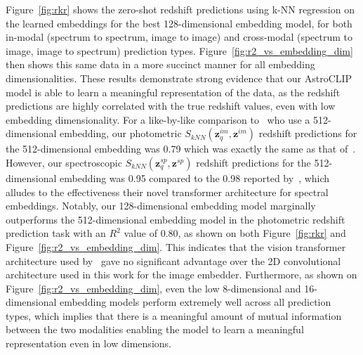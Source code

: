 Figure~\eqref{fig:rkr} shows the zero-shot redshift predictions using k-NN regression on the learned embeddings for
the best 128-dimensional embedding model, for both in-modal (spectrum to spectrum, image to image) and cross-modal (spectrum to image,
image to spectrum) prediction types.
Figure~\eqref{fig:r2_vs_embedding_dim} then shows this same data in a more succinct manner for all embedding dimensionalities.
These results demonstrate strong evidence that our AstroCLIP model is able to learn a meaningful representation of the
data, as the redshift predictions are highly correlated with the true redshift values, even with low embedding dimensionality.
For a like-by-like comparison to~\cite{astroclip} who use a 512-dimensional embedding, our photometric
$S_{kNN}(\mathbf{z}_{q}^{im}, \mathbf{z}^{im})$ redshift predictions for the 512-dimensional embedding was 0.79 which was
exactly the same as that of~\cite{astroclip}.
However, our spectroscopic $S_{kNN}(\mathbf{z}_{q}^{sp}, \mathbf{z}^{sp})$ redshift predictions for the 512-dimensional
embedding was 0.95 compared to the 0.98 reported by~\cite{astroclip}, which alludes to the effectiveness their novel
transformer architecture for spectral embeddings.
Notably, our 128-dimensional embedding model marginally outperforms the 512-dimensional embedding model in the
photometric redshift prediction task with an $R^{2}$ value of 0.80, as shown on both Figure~\eqref{fig:rkr}
and Figure~\eqref{fig:r2_vs_embedding_dim}.
This indicates that the vision transformer architecture used by~\cite{astroclip} gave no significant advantage over the
2D convolutional architecture used in this work for the image embedder.
Furthermore, as shown on Figure~\eqref{fig:r2_vs_embedding_dim}, even the low 8-dimensional and 16-dimensional embedding
models perform extremely well across all prediction types, which implies that there is a meaningful amount of mutual
information between the two modalities enabling the model to learn a meaningful representation even in low dimensions.

